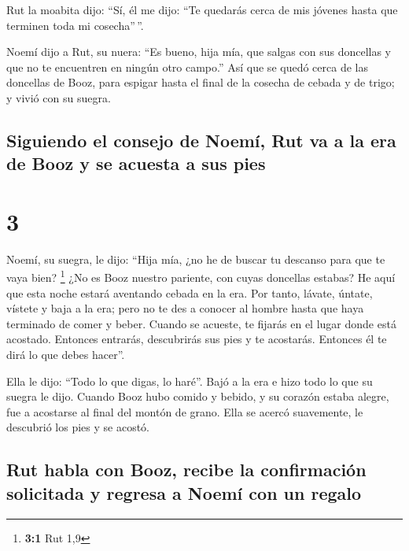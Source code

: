  Rut la moabita dijo: ``Sí, él me dijo: ``Te quedarás
cerca de mis jóvenes hasta que terminen toda mi cosecha''\,''.

 Noemí dijo a Rut, su nuera: ``Es bueno, hija mía, que
salgas con sus doncellas y que no te encuentren en ningún otro campo.''
 Así que se quedó cerca de las doncellas de Booz, para
espigar hasta el final de la cosecha de cebada y de trigo; y vivió con
su suegra.

\hypertarget{siguiendo-el-consejo-de-noemuxed-rut-va-a-la-era-de-booz-y-se-acuesta-a-sus-pies}{%
\subsection{Siguiendo el consejo de Noemí, Rut va a la era de Booz y se
acuesta a sus
pies}\label{siguiendo-el-consejo-de-noemuxed-rut-va-a-la-era-de-booz-y-se-acuesta-a-sus-pies}}

\hypertarget{section-2}{%
\section{3}\label{section-2}}

 Noemí, su suegra, le dijo: ``Hija mía, ¿no he de buscar
tu descanso para que te vaya bien? \footnote{\textbf{3:1} Rut 1,9}
 ¿No es Booz nuestro pariente, con cuyas doncellas
estabas? He aquí que esta noche estará aventando cebada en la era.
 Por tanto, lávate, úntate, vístete y baja a la era; pero
no te des a conocer al hombre hasta que haya terminado de comer y beber.
 Cuando se acueste, te fijarás en el lugar donde está
acostado. Entonces entrarás, descubrirás sus pies y te acostarás.
Entonces él te dirá lo que debes hacer''.

 Ella le dijo: ``Todo lo que digas, lo haré''.
 Bajó a la era e hizo todo lo que su suegra le dijo.
 Cuando Booz hubo comido y bebido, y su corazón estaba
alegre, fue a acostarse al final del montón de grano. Ella se acercó
suavemente, le descubrió los pies y se acostó.

\hypertarget{rut-habla-con-booz-recibe-la-confirmaciuxf3n-solicitada-y-regresa-a-noemuxed-con-un-regalo}{%
\subsection{Rut habla con Booz, recibe la confirmación solicitada y
regresa a Noemí con un
regalo}\label{rut-habla-con-booz-recibe-la-confirmaciuxf3n-solicitada-y-regresa-a-noemuxed-con-un-regalo}}

